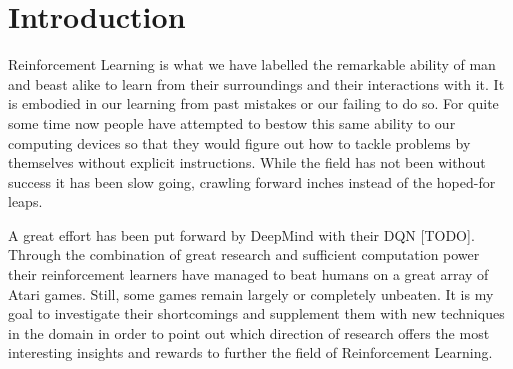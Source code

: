 \chapter{Introduction}
\label{introduction}
Reinforcement Learning is what we have labelled the remarkable ability of man and beast alike 
to learn from their surroundings and their interactions with it.
It is embodied in our learning from past mistakes or our failing to do so.
For quite some time now people have attempted to bestow this same ability to 
our computing devices so that they would figure out how to tackle problems by themselves
without explicit instructions.
While the field has not been without success
it has been slow going,
crawling forward inches instead of the hoped-for leaps.

A great effort has been put forward by DeepMind with their DQN [TODO].
Through the combination of great research and sufficient computation power
their reinforcement learners have managed to beat humans
on a great array of Atari games.
Still, some games remain largely or completely unbeaten.
It is my goal to investigate their shortcomings
and supplement them with new techniques in the domain
in order to point out which direction of research
offers the most interesting insights and rewards
to further the field of Reinforcement Learning. 